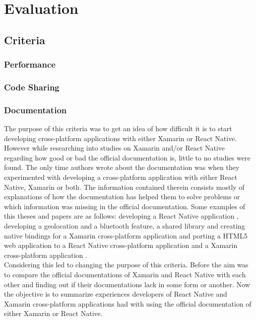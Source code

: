 \documentclass[Bachelor,BIF,english]{twbook}
\begin{document}
\chapter{Evaluation}
\cite[p.~24]{Danielsson_2016}

\section{Criteria}

\subsection{Performance}
\cite[p.~25-26]{Danielsson_2016} \cite[p.~30]{Axelsson2016} \cite[p.~29-31]{Hansson_Vidhall_2016}

\subsection{Code Sharing}
\cite[p.~31]{Hansson_Vidhall_2016}

\subsection{Documentation}
The purpose of this criteria was to get an idea of how difficult it is to start developing cross-platform applications with either Xamarin or React Native. However while researching into studies on Xamarin and/or React Native regarding how good or bad the official documentation is, little to no studies were found. The only time authors wrote about the documentation was when they experimented with developing a cross-platform application with either React Native, Xamarin or both. The information contained therein consists mostly of explanations of how the documentation has helped them to solve problems or which information was missing in the official documentation. Some examples of this theses and papers are as follows: developing a React Native application \cite[p.~16-18]{Danielsson_2016}, developing a geolocation and a bluetooth feature, a shared library and creating native bindings for a Xamarin cross-platform application \cite[p.~10-15]{Dickson_2013} and porting a HTML5 web application to a React Native cross-platform application and a Xamarin cross-platform application \cite[p.~33-69]{ZubaBernhard2017EdPb}.
\\[\baselineskip]
Considering this led to changing the purpose of this criteria. Before the aim was to compare the official documentations of Xamarin and React Native with each other and finding out if their documentations lack in some form or another. Now the objective is to summarize experiences developers of React Native and Xamarin cross-platform applications had with using the official documentation of either Xamarin or React Native. 
\end{document}
